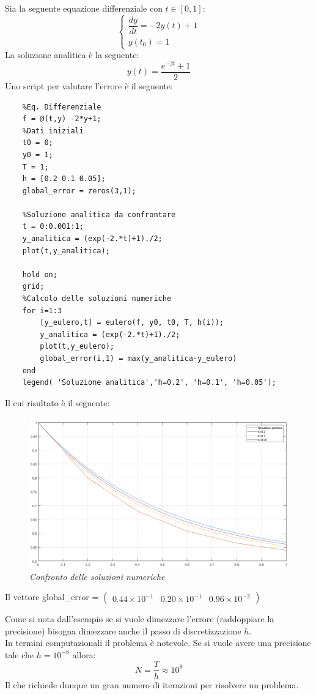 \begin{example}
Sia la seguente equazione differenziale	con $t \in [0,1]$:
\begin{equation*}
	\begin{cases}
		\dfrac{dy}{dt} = -2y(t)+1 \\[0.2cm]
		y(t_{0}) = 1
	\end{cases}
\end{equation*}
La soluzione analitica è la seguente:
\begin{equation*}
	y(t) = \dfrac{e^{-2t}+1}{2}
\end{equation*}
Uno script per valutare l'errore è il seguente:
\begin{verbatim}
	%Eq. Differenziale
	f = @(t,y) -2*y+1;
	%Dati iniziali
	t0 = 0;
	y0 = 1;
	T = 1;
	h = [0.2 0.1 0.05];
	global_error = zeros(3,1);
	
	%Soluzione analitica da confrontare
	t = 0:0.001:1;
	y_analitica = (exp(-2.*t)+1)./2;
	plot(t,y_analitica);
	
	hold on;
	grid;
	%Calcolo delle soluzioni numeriche
	for i=1:3
		[y_eulero,t] = eulero(f, y0, t0, T, h(i));
		y_analitica = (exp(-2.*t)+1)./2;
		plot(t,y_eulero);
		global_error(i,1) = max(y_analitica-y_eulero)
	end
	legend( 'Soluzione analitica','h=0.2', 'h=0.1', 'h=0.05');
\end{verbatim}
Il cui risultato è il seguente:
\begin{figure}[H]
	\centering
	\includegraphics[width=\textwidth]{matlab/errore_troncamento_globale.png}
	\caption{\textit{Confronto delle soluzioni numeriche}}
\end{figure}
Il vettore global\_error =
	$\begin{pmatrix}
		0.44 \times 10^{-1} & 0.20 \times 10^{-1} & 0.96 \times 10^{-2}
	\end{pmatrix}$
\end{example}
Come si nota dall'esempio se si vuole dimezzare l'errore (raddoppiare la precisione) bisogna dimezzare anche il passo di discretizzazione $h$.
\\In termini computazionali il problema è notevole. Se si vuole avere una precisione tale che $h=10^{-8}$ allora:
\begin{equation*}
	N = \dfrac{T}{h} \approx 10^8 
\end{equation*}
Il che richiede dunque un gran numero di iterazioni per risolvere un problema.

